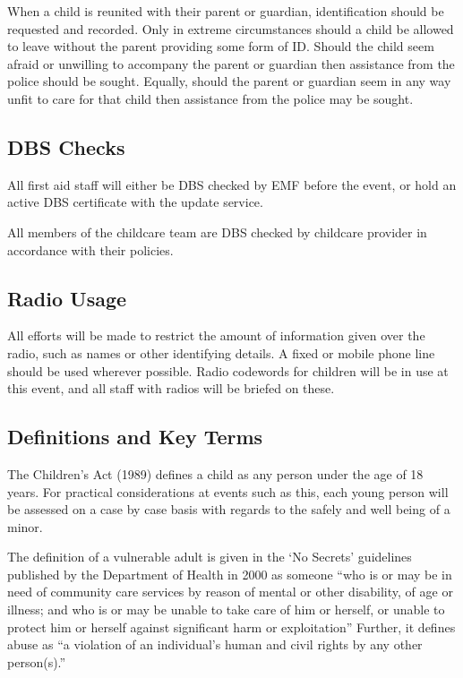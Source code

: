 When a child is reunited with their parent or guardian, identification should be
requested and recorded. Only in extreme circumstances should a child be
allowed to leave without the parent providing some form of ID. Should the child
seem afraid or unwilling to accompany the parent or guardian then assistance
from the police should be sought. Equally, should the parent or guardian
seem in any way unfit to care for that child then assistance from the
police may be sought.

\subsection{DBS Checks}

All first aid staff will either be DBS checked by EMF before the event, or hold an
active DBS certificate with the update service.

All members of the childcare team are DBS checked by childcare provider in accordance
with their policies.

\subsection{Radio Usage}
All efforts will be made to restrict the amount of information given over the
radio, such as names or other identifying details. A fixed or mobile phone line
should be used wherever possible. Radio codewords for children will be in
use at this event, and all staff with radios will be briefed on these.

\subsection{Definitions and Key Terms}

The Children's Act (1989) defines a child as any person under the age of 18
years. For practical considerations at events such as this, each young person
will be assessed on a case by case basis with regards to the safely and well
being of a minor.

The definition of a vulnerable adult is given in the `No Secrets' guidelines
published by the Department of Health in 2000 as someone ``who is or may be in
need of community care services by reason of mental or other disability, of age
or illness; and who is or may be unable to take care of him or herself, or
unable to protect him or herself against significant harm or exploitation''
Further, it defines abuse as ``a violation of an individual's human and civil
rights by any other person(s).''


